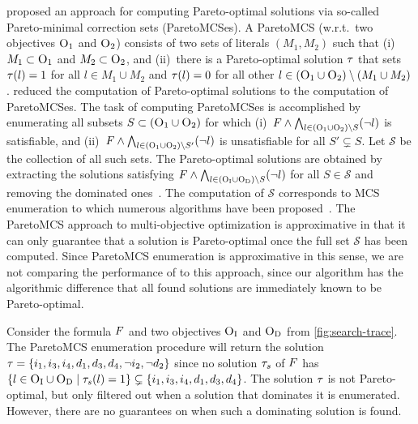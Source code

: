 \Textcites{DBLP:conf/ijcai/Terra-NevesLM18a,DBLP:conf/aaai/Terra-NevesLM18,DBLP:conf/ijcai/Terra-NevesLM18} proposed an approach for computing Pareto-optimal solutions via so-called Pareto-minimal correction sets (ParetoMCSes).
A ParetoMCS (w.r.t.\ two objectives $\textsc{O}_1$ and $\textsc{O}_2$) consists of two sets of literals $(M_1, M_2)$ such that (i)~$M_1 \subset \textsc{O}_1$ and $M_2 \subset \textsc{O}_2$, and (ii)~there is a Pareto-optimal solution $\tau$ that sets $\tau(l) = 1$ for all $l \in M_1 \cup M_2$ and $\tau(l) = 0$ for all other $l \in (\textsc{O}_1 \cup \textsc{O}_2) \setminus (M_1 \cup M_2)$.
\Textcite{DBLP:conf/ijcai/Terra-NevesLM18a} reduced the computation of Pareto-optimal solutions to the computation of ParetoMCSes.
The task of computing ParetoMCSes is accomplished by enumerating all subsets $S \subset  (\textsc{O}_1 \cup \textsc{O}_2)$ for which (i)~$F \land \bigwedge_{l \in  (\textsc{O}_1 \cup \textsc{O}_2) \setminus S} (\lnot l)$ is satisfiable, and (ii)~$F \land \bigwedge_{l \in  (\textsc{O}_1 \cup \textsc{O}_2) \setminus S'} (\lnot l)$ is unsatisfiable for all $S' \subsetneq S$.
Let $\mathcal{S}$ be the collection of all such sets.
The Pareto-optimal solutions are obtained by extracting the solutions satisfying $F \land \bigwedge_{l \in  (\textsc{O}_{\text{I}} \cup \textsc{O}_{\text{D}}) \setminus S} (\lnot l)$ for all $S \in \mathcal{S}$ and removing the dominated ones~\autocite{DBLP:conf/ijcai/Terra-NevesLM18a}.
The computation of $\mathcal{S}$ corresponds to MCS enumeration to which numerous algorithms have been proposed~\autocites{DBLP:conf/lpar/BendikC20,DBLP:conf/hvc/MorgadoLM12,DBLP:conf/sat/PrevitiMJM17}.
The ParetoMCS approach to multi-objective optimization is approximative in that it can only guarantee that a solution is Pareto-optimal once the full set $\mathcal{S}$ has been computed.
Since ParetoMCS enumeration is approximative in this sense, we are not comparing the performance of \algname{} to this approach, since our algorithm has the algorithmic difference that all found solutions are immediately known to be Pareto-optimal.

\begin{example}\label{ex:MCS}
  Consider the formula $F$ and two objectives $\textsc{O}_{\text{I}}$ and $\textsc{O}_{\text{D}}$ from \cref{fig:search-trace}.
  The ParetoMCS enumeration procedure will return the solution $\tau = \{i_1,\allowbreak i_3,\allowbreak i_4,\allowbreak d_1,\allowbreak d_3,\allowbreak d_4,\allowbreak \lnot i_2,\allowbreak \lnot d_2\}$ since no solution $\tau_s$ of $F$ has $\{l \in \textsc{O}_{\text{I}} \cup \textsc{O}_{\text{D}} \mid  \tau_s(l) = 1\} \subsetneq \{i_1, i_3, i_4, d_1, d_3, d_4\}$.
  The solution $\tau$ is not Pareto-optimal, but only filtered out when a solution that dominates it is enumerated.
  However, there are no guarantees on when such a dominating solution is found. 
\end{example}

